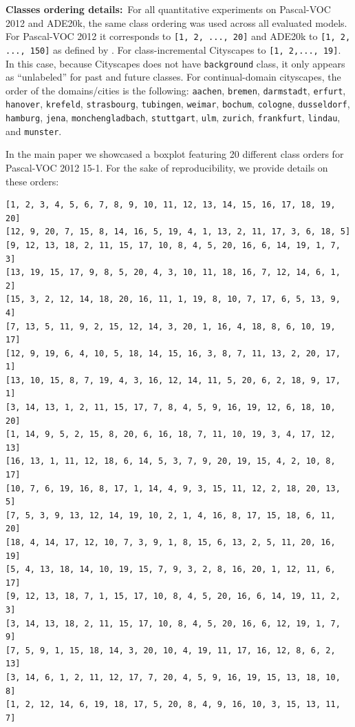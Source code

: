 \noindent\textbf{Classes ordering details:\,} For all quantitative experiments on Pascal-VOC 2012
and ADE20k, the same class ordering was used across all evaluated models. For Pascal-VOC 2012 it
corresponds to \lstinline![1, 2, ..., 20]! and ADE20k to \lstinline![1, 2, ..., 150]! as defined by
\citet{cermelli2020modelingthebackground}. For class-incremental Cityscapes to \lstinline![1, 2,..., 19]!. In this case, because Cityscapes does not have \texttt{background} class, it only appears
as ``unlabeled'' for past and future classes. For continual-domain cityscapes, the order of the
domains/cities is the following: \texttt{aachen}, \texttt{bremen}, \texttt{darmstadt},
\texttt{erfurt}, \texttt{hanover}, \texttt{krefeld}, \texttt{strasbourg}, \texttt{tubingen},
\texttt{weimar}, \texttt{bochum}, \texttt{cologne}, \texttt{dusseldorf}, \texttt{hamburg},
\texttt{jena}, \texttt{monchengladbach}, \texttt{stuttgart}, \texttt{ulm}, \texttt{zurich},
\texttt{frankfurt}, \texttt{lindau}, and \texttt{munster}.

In the main paper we showcased a boxplot featuring 20 different class orders for Pascal-VOC 2012
15-1. For the sake of reproducibility, we provide details on these orders:

\begin{adjustbox}{width=\columnwidth,center}
    \begin{lstlisting}
[1, 2, 3, 4, 5, 6, 7, 8, 9, 10, 11, 12, 13, 14, 15, 16, 17, 18, 19, 20]
[12, 9, 20, 7, 15, 8, 14, 16, 5, 19, 4, 1, 13, 2, 11, 17, 3, 6, 18, 5]
[9, 12, 13, 18, 2, 11, 15, 17, 10, 8, 4, 5, 20, 16, 6, 14, 19, 1, 7, 3]
[13, 19, 15, 17, 9, 8, 5, 20, 4, 3, 10, 11, 18, 16, 7, 12, 14, 6, 1, 2]
[15, 3, 2, 12, 14, 18, 20, 16, 11, 1, 19, 8, 10, 7, 17, 6, 5, 13, 9, 4]
[7, 13, 5, 11, 9, 2, 15, 12, 14, 3, 20, 1, 16, 4, 18, 8, 6, 10, 19, 17]
[12, 9, 19, 6, 4, 10, 5, 18, 14, 15, 16, 3, 8, 7, 11, 13, 2, 20, 17, 1]
[13, 10, 15, 8, 7, 19, 4, 3, 16, 12, 14, 11, 5, 20, 6, 2, 18, 9, 17, 1]
[3, 14, 13, 1, 2, 11, 15, 17, 7, 8, 4, 5, 9, 16, 19, 12, 6, 18, 10, 20]
[1, 14, 9, 5, 2, 15, 8, 20, 6, 16, 18, 7, 11, 10, 19, 3, 4, 17, 12, 13]
[16, 13, 1, 11, 12, 18, 6, 14, 5, 3, 7, 9, 20, 19, 15, 4, 2, 10, 8, 17]
[10, 7, 6, 19, 16, 8, 17, 1, 14, 4, 9, 3, 15, 11, 12, 2, 18, 20, 13, 5]
[7, 5, 3, 9, 13, 12, 14, 19, 10, 2, 1, 4, 16, 8, 17, 15, 18, 6, 11, 20]
[18, 4, 14, 17, 12, 10, 7, 3, 9, 1, 8, 15, 6, 13, 2, 5, 11, 20, 16, 19]
[5, 4, 13, 18, 14, 10, 19, 15, 7, 9, 3, 2, 8, 16, 20, 1, 12, 11, 6, 17]
[9, 12, 13, 18, 7, 1, 15, 17, 10, 8, 4, 5, 20, 16, 6, 14, 19, 11, 2, 3]
[3, 14, 13, 18, 2, 11, 15, 17, 10, 8, 4, 5, 20, 16, 6, 12, 19, 1, 7, 9]
[7, 5, 9, 1, 15, 18, 14, 3, 20, 10, 4, 19, 11, 17, 16, 12, 8, 6, 2, 13]
[3, 14, 6, 1, 2, 11, 12, 17, 7, 20, 4, 5, 9, 16, 19, 15, 13, 18, 10, 8]
[1, 2, 12, 14, 6, 19, 18, 17, 5, 20, 8, 4, 9, 16, 10, 3, 15, 13, 11, 7]
\end{lstlisting}
\end{adjustbox}

